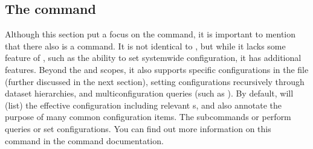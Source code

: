 \subsection{The  command}
\label{\detokenize{basics/101-122-config:the-datalad-configuration-command}}\label{\detokenize{basics/101-122-config:index-6}}
\sphinxAtStartPar
Although this section put a focus on the  command, it is important to mention that there also is a  command.
It is not identical to , but while it lacks some feature of , such as the ability to set system\sphinxhyphen{}wide configuration, it has additional features.
Beyond the  and  scopes, it also supports {\hyperref[\detokenize{glossary:term-branch}]{}} specific configurations in the  file (further discussed in the next section), setting configurations recursively through dataset hierarchies, and multi\sphinxhyphen{}configuration queries (such as ).
By default,  will  (list) the effective configuration including relevant  {\hyperref[\detokenize{glossary:term-environment-variable}]{}}s, and also annotate the purpose of many common configuration items.
The subcommands  or  perform queries or set configurations.
You can find out more information on this command in the command documentation.


